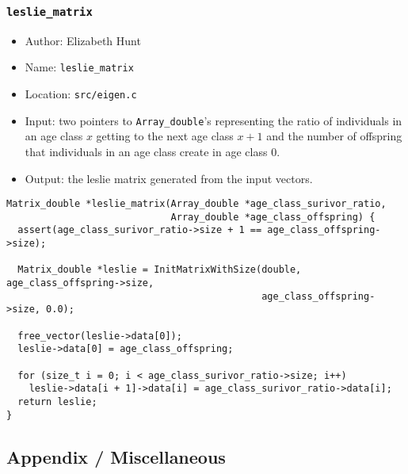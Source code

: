 \documentclass[11pt]{article}
\begin{document}
\subsubsection{\texttt{leslie\_matrix}}
\label{sec:org8f93a53}
\begin{itemize}
\item Author: Elizabeth Hunt
\item Name: \texttt{leslie\_matrix}
\item Location: \texttt{src/eigen.c}
\item Input: two pointers to \texttt{Array\_double}'s representing the ratio of individuals in an age class
\(x\) getting to the next age class \(x+1\) and the number of offspring that individuals in an age
class create in age class 0.
\item Output: the leslie matrix generated from the input vectors.
\end{itemize}

\begin{verbatim}
Matrix_double *leslie_matrix(Array_double *age_class_surivor_ratio,
                             Array_double *age_class_offspring) {
  assert(age_class_surivor_ratio->size + 1 == age_class_offspring->size);

  Matrix_double *leslie = InitMatrixWithSize(double, age_class_offspring->size,
                                             age_class_offspring->size, 0.0);

  free_vector(leslie->data[0]);
  leslie->data[0] = age_class_offspring;

  for (size_t i = 0; i < age_class_surivor_ratio->size; i++)
    leslie->data[i + 1]->data[i] = age_class_surivor_ratio->data[i];
  return leslie;
}
\end{verbatim}
\subsection{Appendix / Miscellaneous}
\label{sec:orgcf92e29}
\end{document}
